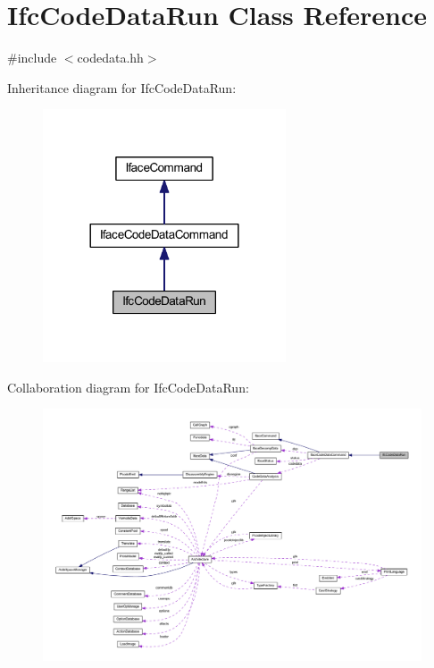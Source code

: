 \hypertarget{class_ifc_code_data_run}{}\section{Ifc\+Code\+Data\+Run Class Reference}
\label{class_ifc_code_data_run}


{\ttfamily \#include $<$codedata.\+hh$>$}



Inheritance diagram for Ifc\+Code\+Data\+Run\+:
\nopagebreak
\begin{figure}[H]
\begin{center}
\leavevmode
\includegraphics[width=204pt]{class_ifc_code_data_run__inherit__graph}
\end{center}
\end{figure}


Collaboration diagram for Ifc\+Code\+Data\+Run\+:
\nopagebreak
\begin{figure}[H]
\begin{center}
\leavevmode
\includegraphics[width=350pt]{class_ifc_code_data_run__coll__graph}
\end{center}
\end{figure}
